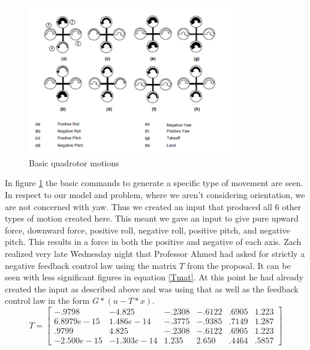\documentclass[12pt]{extarticle}
\begin{document}
\begin{figure}[h!]
    \centering
    \includegraphics[width=0.8\textwidth]{Images/quadrotor2}
    \caption{Basic quadrotor motions}\label{fig:quadmotions}
\end{figure}
In figure \ref{fig:quadmotions} the basic commands to generate a specific type of movement are seen. In respect to our model and problem, where we aren't considering orientation, we are not concerned with yaw. Thus we created an input that produced all 6 other types of motion created here. This meant we gave an input to give pure upward force, downward force, positive roll, negative roll, positive pitch, and negative pitch. This results in a force in both the positive and negative of each axis. Zach realized very late Wednesday night that Professor Ahmed had asked for strictly a negative feedback control law using the matrix $T$ from the proposal. It can be seen with less significant figures in equation \ref{Tmat}. At this point he had already created the input as described above and was using that as well as the feedback control law in the form $G*(u-T*x)$.
\begin{equation}\label{Tmat}
    T=\begin{bmatrix}
    -.9798& -4.825& -.2308& -.6122& .6905& 1.223\\
    6.8979e-15& 1.486e-14& -.3775& -.9385& .7149& 1.287\\
    .9799& 4.825& -.2308& -.6122& .6905& 1.223\\
    -2.500e-15& -1.303e-14& 1.235& 2.650& .4464& .5857
    \end{bmatrix}
\end{equation}
\end{document}
